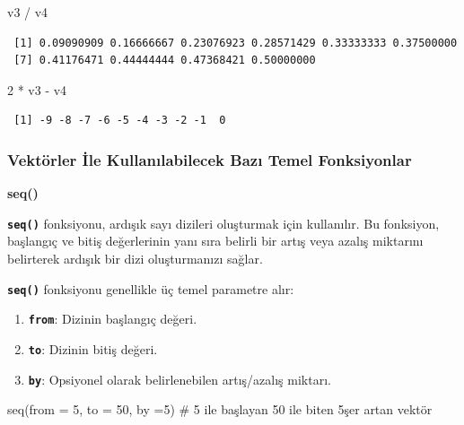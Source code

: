 \documentclass[
  letterpaper,
  DIV=11,
  numbers=noendperiod]{scrreprt}
\newenvironment{Shaded}{\begin{snugshade}}{\end{snugshade}}
\newcommand{\AttributeTok}[1]{\textcolor[rgb]{0.40,0.45,0.13}{#1}}
\newcommand{\CommentTok}[1]{\textcolor[rgb]{0.37,0.37,0.37}{#1}}
\newcommand{\DecValTok}[1]{\textcolor[rgb]{0.68,0.00,0.00}{#1}}
\newcommand{\FunctionTok}[1]{\textcolor[rgb]{0.28,0.35,0.67}{#1}}
\newcommand{\NormalTok}[1]{\textcolor[rgb]{0.00,0.23,0.31}{#1}}
\newcommand{\SpecialCharTok}[1]{\textcolor[rgb]{0.37,0.37,0.37}{#1}}
\begin{document}
\begin{Shaded}
\begin{Highlighting}[]
\NormalTok{v3 }\SpecialCharTok{/}\NormalTok{ v4}
\end{Highlighting}
\end{Shaded}

\begin{verbatim}
 [1] 0.09090909 0.16666667 0.23076923 0.28571429 0.33333333 0.37500000
 [7] 0.41176471 0.44444444 0.47368421 0.50000000
\end{verbatim}

\begin{Shaded}
\begin{Highlighting}[]
\DecValTok{2} \SpecialCharTok{*}\NormalTok{ v3 }\SpecialCharTok{{-}}\NormalTok{ v4}
\end{Highlighting}
\end{Shaded}

\begin{verbatim}
 [1] -9 -8 -7 -6 -5 -4 -3 -2 -1  0
\end{verbatim}

\subsubsection{Vektörler İle Kullanılabilecek Bazı Temel
Fonksiyonlar}\label{vektuxf6rler-ile-kullanux131labilecek-bazux131-temel-fonksiyonlar}

\textbf{seq()}

\textbf{\texttt{seq()}} fonksiyonu, ardışık sayı dizileri oluşturmak
için kullanılır. Bu fonksiyon, başlangıç ve bitiş değerlerinin yanı sıra
belirli bir artış veya azalış miktarını belirterek ardışık bir dizi
oluşturmanızı sağlar.

\textbf{\texttt{seq()}} fonksiyonu genellikle üç temel parametre alır:

\begin{enumerate}
\def\labelenumi{\arabic{enumi}.}
\item
  \textbf{\texttt{from}}: Dizinin başlangıç değeri.
\item
  \textbf{\texttt{to}}: Dizinin bitiş değeri.
\item
  \textbf{\texttt{by}}: Opsiyonel olarak belirlenebilen artış/azalış
  miktarı.
\end{enumerate}

\begin{Shaded}
\begin{Highlighting}[]
\FunctionTok{seq}\NormalTok{(}\AttributeTok{from =} \DecValTok{5}\NormalTok{, }\AttributeTok{to =} \DecValTok{50}\NormalTok{, }\AttributeTok{by =}\DecValTok{5}\NormalTok{) }\CommentTok{\# 5 ile başlayan 50 ile biten 5şer artan vektör}
\end{Highlighting}
\end{Shaded}
\end{document}

